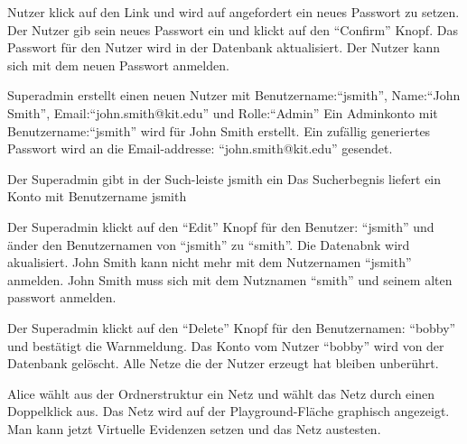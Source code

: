 \documentclass[parskip=full,11pt,twoside]{scrartcl}
\begin{document}
{Nutzer klick auf den Link und wird auf angefordert ein neues Passwort zu setzen. Der Nutzer gib sein neues Passwort ein und klickt auf den \enquote{Confirm} Knopf.}
{Das Passwort für den Nutzer wird in der Datenbank aktualisiert. Der Nutzer kann sich mit dem neuen Passwort anmelden.}




{Superadmin erstellt einen neuen Nutzer mit Benutzername:\enquote{jsmith}, Name:\enquote{John Smith}, Email:\enquote{john.smith@kit.edu} und Rolle:\enquote{Admin}}
{Ein Adminkonto mit Benutzername:\enquote{jsmith} wird für John Smith erstellt. Ein zufällig generiertes Passwort wird an die Email-addresse: \enquote{john.smith@kit.edu} gesendet.  }

{Der Superadmin gibt in der Such-leiste jsmith ein}
{Das Sucherbegnis liefert ein Konto mit Benutzername jsmith}

{Der Superadmin klickt auf den \enquote{Edit} Knopf für den Benutzer: \enquote{jsmith} und änder den Benutzernamen von \enquote{jsmith} zu \enquote{smith}.}
{Die Datenabnk wird akualisiert. John Smith kann nicht mehr mit dem Nutzernamen \enquote{jsmith} anmelden. John Smith muss sich mit dem Nutznamen \enquote{smith} und seinem alten passwort anmelden.}

{Der Superadmin klickt auf den \enquote{Delete} Knopf für den Benutzernamen: \enquote{bobby} und bestätigt die Warnmeldung.}
{Das Konto vom Nutzer \enquote{bobby} wird von der Datenbank gelöscht. Alle Netze die der Nutzer erzeugt hat bleiben unberührt.}




{Alice wählt aus der Ordnerstruktur ein Netz und wählt das Netz durch einen Doppelklick aus. }
{Das Netz wird auf der Playground-Fläche graphisch angezeigt. Man kann jetzt Virtuelle Evidenzen setzen und das Netz austesten.}
\end{document}
